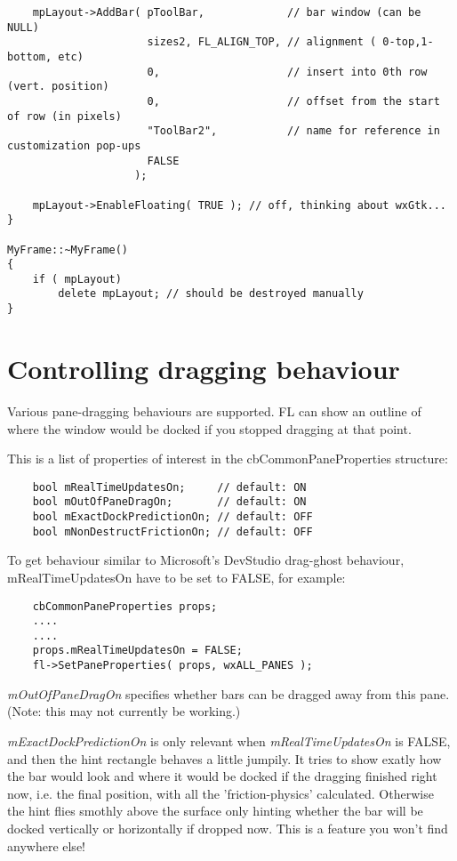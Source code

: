 \begin{verbatim}
    mpLayout->AddBar( pToolBar,             // bar window (can be NULL)
                      sizes2, FL_ALIGN_TOP, // alignment ( 0-top,1-bottom, etc)
                      0,                    // insert into 0th row (vert. position)
                      0,                    // offset from the start of row (in pixels)
                      "ToolBar2",           // name for reference in customization pop-ups
                      FALSE
                    );
    
    mpLayout->EnableFloating( TRUE ); // off, thinking about wxGtk...
}

MyFrame::~MyFrame()
{
    if ( mpLayout) 
        delete mpLayout; // should be destroyed manually
}
\end{verbatim}

\section{Controlling dragging behaviour}\label{controllingdragbehav}

Various pane-dragging behaviours are supported. FL can
show an outline of where the window would be docked
if you stopped dragging at that point.

This is a list of properties of interest in the cbCommonPaneProperties
structure:

\begin{verbatim}
    bool mRealTimeUpdatesOn;     // default: ON
    bool mOutOfPaneDragOn;       // default: ON
    bool mExactDockPredictionOn; // default: OFF
    bool mNonDestructFrictionOn; // default: OFF
\end{verbatim}

To get behaviour similar to Microsoft's DevStudio drag-ghost behaviour,
mRealTimeUpdatesOn have to be set to FALSE, for example:

\begin{verbatim}
    cbCommonPaneProperties props;
    ....
    ....
    props.mRealTimeUpdatesOn = FALSE;
    fl->SetPaneProperties( props, wxALL_PANES );
\end{verbatim}

{\it mOutOfPaneDragOn} specifies whether bars can be dragged
away from this pane. (Note: this may not currently be working.)

{\it mExactDockPredictionOn} is only relevant when {\it mRealTimeUpdatesOn} is FALSE,
and then the hint rectangle behaves a little jumpily. It tries to show
exatly how the bar would look and where it would be docked if the dragging finished right
now, i.e. the final position, with all the 'friction-physics' calculated.
Otherwise the hint flies smothly above the surface only hinting whether the bar
will be docked vertically or horizontally if dropped now.
This is a feature you won't find anywhere else!

